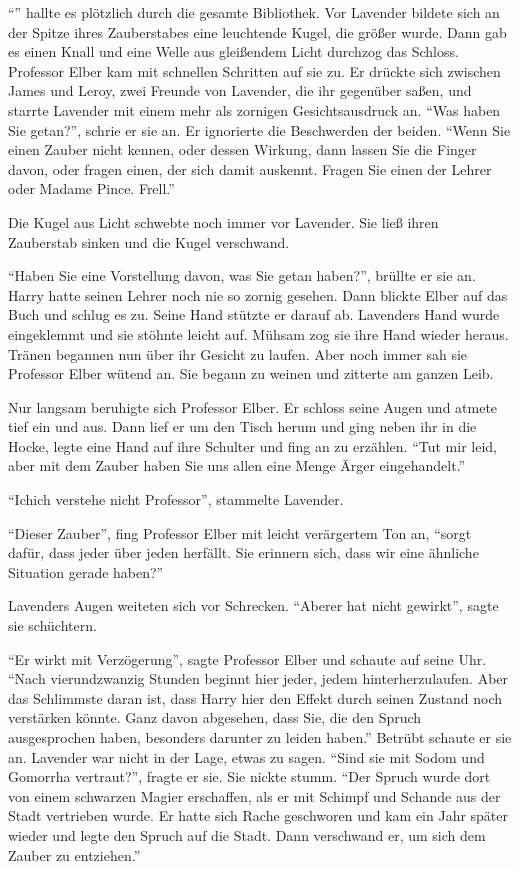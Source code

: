 \enquote{} hallte es plötzlich durch die gesamte Bibliothek. Vor Lavender bildete sich an der Spitze ihres Zauberstabes eine leuchtende Kugel, die größer wurde. Dann gab es einen Knall und eine Welle aus gleißendem Licht durchzog das Schloss. Professor Elber kam mit schnellen Schritten auf sie zu. Er drückte sich zwischen James und Leroy, zwei Freunde von Lavender, die ihr gegenüber saßen, und starrte Lavender mit einem mehr als zornigen Gesichtsausdruck an. \enquote{Was haben Sie getan?}, schrie er sie an. Er ignorierte die Beschwerden der beiden. \enquote{Wenn Sie einen Zauber nicht kennen, oder dessen Wirkung, dann lassen Sie die Finger davon, oder fragen einen, der sich damit auskennt. Fragen Sie einen der Lehrer oder Madame Pince. Frell.}

Die Kugel aus Licht schwebte noch immer vor Lavender. Sie ließ ihren Zauberstab sinken und die Kugel verschwand.

\enquote{Haben Sie eine Vorstellung davon, was Sie getan haben?}, brüllte er sie an. Harry hatte seinen Lehrer noch nie so zornig gesehen. Dann blickte Elber auf das Buch und schlug es zu. Seine Hand stützte er darauf ab. Lavenders Hand wurde eingeklemmt und sie stöhnte leicht auf. Mühsam zog sie ihre Hand wieder heraus. Tränen begannen nun über ihr Gesicht zu laufen. Aber noch immer sah sie Professor Elber wütend an. Sie begann zu weinen und zitterte am ganzen Leib.

Nur langsam beruhigte sich Professor Elber. Er schloss seine Augen und atmete tief ein und aus. Dann lief er um den Tisch herum und ging neben ihr in die Hocke, legte eine Hand auf ihre Schulter und fing an zu erzählen. \enquote{Tut mir leid, aber mit dem Zauber haben Sie uns allen eine Menge Ärger eingehandelt.}

\enquote{Ich\abs ich verstehe nicht Professor}, stammelte Lavender.

\enquote{Dieser Zauber}, fing Professor Elber mit leicht verärgertem Ton an, \enquote{sorgt dafür, dass jeder über jeden herfällt. Sie erinnern sich, dass wir eine ähnliche Situation gerade haben?}

Lavenders Augen weiteten sich vor Schrecken. \enquote{Aber\abs er hat nicht gewirkt}, sagte sie schüchtern.

\enquote{Er wirkt mit Verzögerung}, sagte Professor Elber und schaute auf seine Uhr. \enquote{Nach vierundzwanzig Stunden beginnt hier jeder, jedem hinterherzulaufen. Aber das Schlimmste daran ist, dass Harry hier den Effekt durch seinen Zustand noch verstärken könnte. Ganz davon abgesehen, dass Sie, die den Spruch ausgesprochen haben, besonders darunter zu leiden haben.} Betrübt schaute er sie an. Lavender war nicht in der Lage, etwas zu sagen. \enquote{Sind sie mit Sodom und Gomorrha vertraut?}, fragte er sie. Sie nickte stumm. \enquote{Der Spruch wurde dort von einem schwarzen Magier erschaffen, als er mit Schimpf und Schande aus der Stadt vertrieben wurde. Er hatte sich Rache geschworen und kam ein Jahr später wieder und legte den Spruch auf die Stadt. Dann verschwand er, um sich dem Zauber zu entziehen.}

